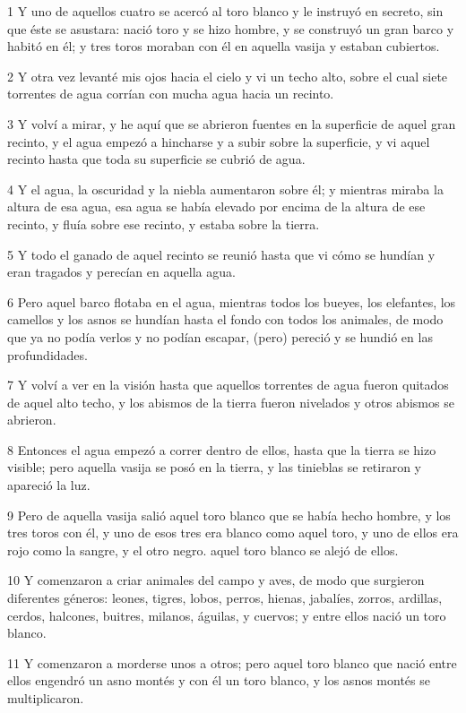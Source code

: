 \par 1 Y uno de aquellos cuatro se acercó al toro blanco y le instruyó en secreto, sin que éste se asustara: nació toro y se hizo hombre, y se construyó un gran barco y habitó en él; y tres toros moraban con él en aquella vasija y estaban cubiertos.
\par 2 Y otra vez levanté mis ojos hacia el cielo y vi un techo alto, sobre el cual siete torrentes de agua corrían con mucha agua hacia un recinto.
\par 3 Y volví a mirar, y he aquí que se abrieron fuentes en la superficie de aquel gran recinto, y el agua empezó a hincharse y a subir sobre la superficie, y vi aquel recinto hasta que toda su superficie se cubrió de agua.
\par 4 Y el agua, la oscuridad y la niebla aumentaron sobre él; y mientras miraba la altura de esa agua, esa agua se había elevado por encima de la altura de ese recinto, y fluía sobre ese recinto, y estaba sobre la tierra.
\par 5 Y todo el ganado de aquel recinto se reunió hasta que vi cómo se hundían y eran tragados y perecían en aquella agua.
\par 6 Pero aquel barco flotaba en el agua, mientras todos los bueyes, los elefantes, los camellos y los asnos se hundían hasta el fondo con todos los animales, de modo que ya no podía verlos y no podían escapar, (pero) pereció y se hundió en las profundidades.
\par 7 Y volví a ver en la visión hasta que aquellos torrentes de agua fueron quitados de aquel alto techo, y los abismos de la tierra fueron nivelados y otros abismos se abrieron.
\par 8 Entonces el agua empezó a correr dentro de ellos, hasta que la tierra se hizo visible; pero aquella vasija se posó en la tierra, y las tinieblas se retiraron y apareció la luz.
\par 9 Pero de aquella vasija salió aquel toro blanco que se había hecho hombre, y los tres toros con él, y uno de esos tres era blanco como aquel toro, y uno de ellos era rojo como la sangre, y el otro negro. aquel toro blanco se alejó de ellos.
\par 10 Y comenzaron a criar animales del campo y aves, de modo que surgieron diferentes géneros: leones, tigres, lobos, perros, hienas, jabalíes, zorros, ardillas, cerdos, halcones, buitres, milanos, águilas, y cuervos; y entre ellos nació un toro blanco.
\par 11 Y comenzaron a morderse unos a otros; pero aquel toro blanco que nació entre ellos engendró un asno montés y con él un toro blanco, y los asnos montés se multiplicaron.
